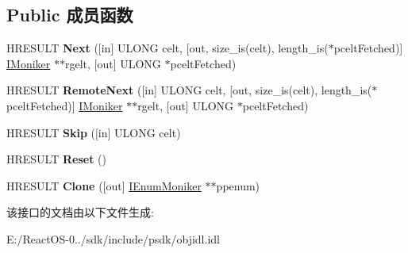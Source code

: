 \subsection*{Public 成员函数}
\begin{DoxyCompactItemize}
\item 
\mbox{\label{interface_i_enum_moniker_a6c9ebe646a7438aec5ee37d3fc41858b}} 
H\+R\+E\+S\+U\+LT {\bfseries Next} (\mbox{[}in\mbox{]} U\+L\+O\+NG celt, \mbox{[}out, size\+\_\+is(celt), length\+\_\+is($\ast$pcelt\+Fetched)\mbox{]} \hyperlink{interface_i_moniker}{I\+Moniker} $\ast$$\ast$rgelt, \mbox{[}out\mbox{]} U\+L\+O\+NG $\ast$pcelt\+Fetched)
\item 
\mbox{\label{interface_i_enum_moniker_abc5043eac67e989902ecbe6f81855474}} 
H\+R\+E\+S\+U\+LT {\bfseries Remote\+Next} (\mbox{[}in\mbox{]} U\+L\+O\+NG celt, \mbox{[}out, size\+\_\+is(celt), length\+\_\+is($\ast$pcelt\+Fetched)\mbox{]} \hyperlink{interface_i_moniker}{I\+Moniker} $\ast$$\ast$rgelt, \mbox{[}out\mbox{]} U\+L\+O\+NG $\ast$pcelt\+Fetched)
\item 
\mbox{\label{interface_i_enum_moniker_a300f2d1b4778a2214c04f1434842ced2}} 
H\+R\+E\+S\+U\+LT {\bfseries Skip} (\mbox{[}in\mbox{]} U\+L\+O\+NG celt)
\item 
\mbox{\label{interface_i_enum_moniker_a00b5e30cef17958809274023ede9edbb}} 
H\+R\+E\+S\+U\+LT {\bfseries Reset} ()
\item 
\mbox{\label{interface_i_enum_moniker_a3b1e17c38d99d42864e122f98653bacb}} 
H\+R\+E\+S\+U\+LT {\bfseries Clone} (\mbox{[}out\mbox{]} \hyperlink{interface_i_enum_moniker}{I\+Enum\+Moniker} $\ast$$\ast$ppenum)
\end{DoxyCompactItemize}


该接口的文档由以下文件生成\+:\begin{DoxyCompactItemize}
\item 
E\+:/\+React\+O\+S-\/0../sdk/include/psdk/objidl.\+idl\end{DoxyCompactItemize}
